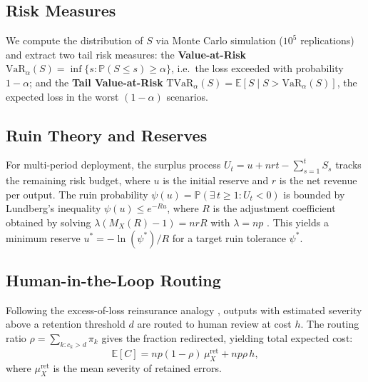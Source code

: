 \documentclass[11pt]{article}
\newcommand{\VaR}{\mathrm{VaR}}
\newcommand{\TVaR}{\mathrm{TVaR}}
\begin{document}
\subsection{Risk Measures}

We compute the distribution of $S$ via Monte Carlo simulation
($10^5$ replications) and extract two tail risk measures: the
\textbf{Value-at-Risk}
$\VaR_\alpha(S) = \inf\{s : \mathbb{P}(S \leq s) \geq \alpha\}$,
i.e.\ the loss exceeded with probability $1 - \alpha$; and the
\textbf{Tail Value-at-Risk}
$\TVaR_\alpha(S) = \mathbb{E}[S \mid S > \VaR_\alpha(S)]$,
the expected loss in the worst $(1 - \alpha)$ scenarios.

\subsection{Ruin Theory and Reserves}

For multi-period deployment, the surplus process
$U_t = u + nrt - \sum_{s=1}^{t} S_s$ tracks the remaining risk
budget, where $u$ is the initial reserve and $r$ is the net revenue
per output. The ruin probability
$\psi(u) = \mathbb{P}(\exists\, t \geq 1 : U_t < 0)$ is bounded
by Lundberg's inequality $\psi(u) \leq e^{-Ru}$, where $R$ is the
adjustment coefficient obtained by solving
$\lambda(M_X(R) - 1) = nrR$ with $\lambda = np$
\citep{dickson2016insurance}. This yields a minimum reserve
$u^* = -\ln(\psi^*) / R$ for a target ruin tolerance $\psi^*$.

\subsection{Human-in-the-Loop Routing}

Following the excess-of-loss reinsurance analogy
\citep{beauchemin2026position}, outputs with estimated severity above
a retention threshold $d$ are routed to human review at cost $h$.
The routing ratio $\rho = \sum_{k : c_k > d} \pi_k$ gives the
fraction redirected, yielding total expected cost:
\begin{equation}
  \mathbb{E}[C] = n p (1 - \rho) \, \mu_X^{\mathrm{ret}} + n p \rho \, h,
  \label{eq:routing}
\end{equation}
where $\mu_X^{\mathrm{ret}}$ is the mean severity of retained errors.

\end{document}
